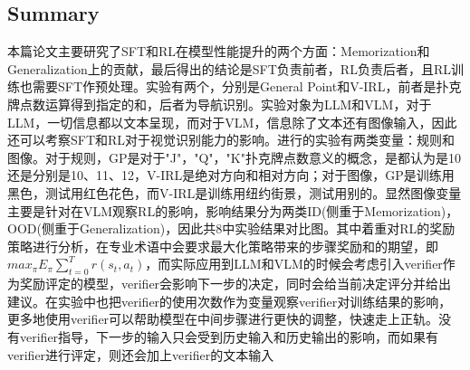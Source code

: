 \documentclass[a4paper,12pt]{article}
\begin{document}
\subsection{Summary}
本篇论文主要研究了SFT和RL在模型性能提升的两个方面：Memorization和Generalization上的贡献，最后得出的结论是SFT负责前者，RL负责后者，且RL训练也需要SFT作预处理。实验有两个，分别是General Point和V-IRL，前者是扑克牌点数运算得到指定的和，后者为导航识别。实验对象为LLM和VLM，对于LLM，一切信息都以文本呈现，而对于VLM，信息除了文本还有图像输入，因此还可以考察SFT和RL对于视觉识别能力的影响。进行的实验有两类变量：规则和图像。对于规则，GP是对于"J"，"Q"，"K"扑克牌点数意义的概念，是都认为是10还是分别是10、11、12，V-IRL是绝对方向和相对方向；对于图像，GP是训练用黑色，测试用红色花色，而V-IRL是训练用纽约街景，测试用别的。显然图像变量主要是针对在VLM观察RL的影响，影响结果分为两类ID(侧重于Memorization)，OOD(侧重于Generalization)，因此共8中实验结果对比图。其中着重对RL的奖励策略进行分析，在专业术语中会要求最大化策略带来的步骤奖励和的期望，即$max_{\pi}E_{\pi}\sum_{t=0}^{T}r(s_t, a_t)$，而实际应用到LLM和VLM的时候会考虑引入verifier作为奖励评定的模型，verifier会影响下一步的决定，同时会给当前决定评分并给出建议。在实验中也把verifier的使用次数作为变量观察verifier对训练结果的影响，更多地使用verifier可以帮助模型在中间步骤进行更快的调整，快速走上正轨。没有verifier指导，下一步的输入只会受到历史输入和历史输出的影响，而如果有verifier进行评定，则还会加上verifier的文本输入
\end{document}
